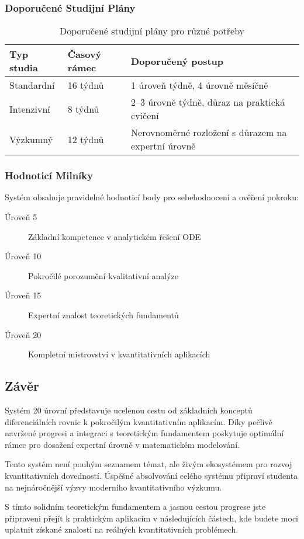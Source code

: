 \subsubsection{Doporučené Studijní Plány}

\begin{table}[ht]
\centering
\begin{tabular}{p{}p{}p{}}
\toprule
\textbf{Typ studia} & \textbf{Časový rámec} & \textbf{Doporučený postup} \\
\midrule
Standardní & 16 týdnů & 1 úroveň týdně, 4 úrovně měsíčně \\
Intenzivní & 8 týdnů & 2–3 úrovně týdně, důraz na praktická cvičení \\
Výzkumný & 12 týdnů & Nerovnoměrné rozložení s důrazem na expertní úrovně \\
\bottomrule
\end{tabular}
\caption{Doporučené studijní plány pro různé potřeby}
\label{tab:studijni-plany}
\end{table}

\subsubsection{Hodnoticí Milníky}

Systém obsahuje pravidelné hodnoticí body pro sebehodnocení a ověření pokroku:

\begin{description}
\item[Úroveň 5] Základní kompetence v analytickém řešení ODE
\item[Úroveň 10] Pokročilé porozumění kvalitativní analýze
\item[Úroveň 15] Expertní znalost teoretických fundamentů
\item[Úroveň 20] Kompletní mistrovství v kvantitativních aplikacích
\end{description}

\subsection{Závěr}

Systém 20 úrovní představuje ucelenou cestu od základních konceptů diferenciálních rovnic k pokročilým kvantitativním aplikacím. Díky pečlivě navržené progresi a integraci s teoretickým fundamentem poskytuje optimální rámec pro dosažení expertní úrovně v matematickém modelování.

\begin{remark}
Tento systém není pouhým seznamem témat, ale živým ekosystémem pro rozvoj kvantitativních dovedností. Úspěšné absolvování celého systému připraví studenta na nejnáročnější výzvy moderního kvantitativního výzkumu.
\end{remark}

S tímto solidním teoretickým fundamentem a jasnou cestou progrese jste připraveni přejít k praktickým aplikacím v následujících částech, kde budete moci uplatnit získané znalosti na reálných kvantitativních problémech.